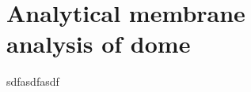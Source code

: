 
\chapter[Analytical membrane analysis of dome]{Analytical membrane\\ analysis of dome}
\label{app:Analytical membrane analysis of dome}

sdfasdfasdf